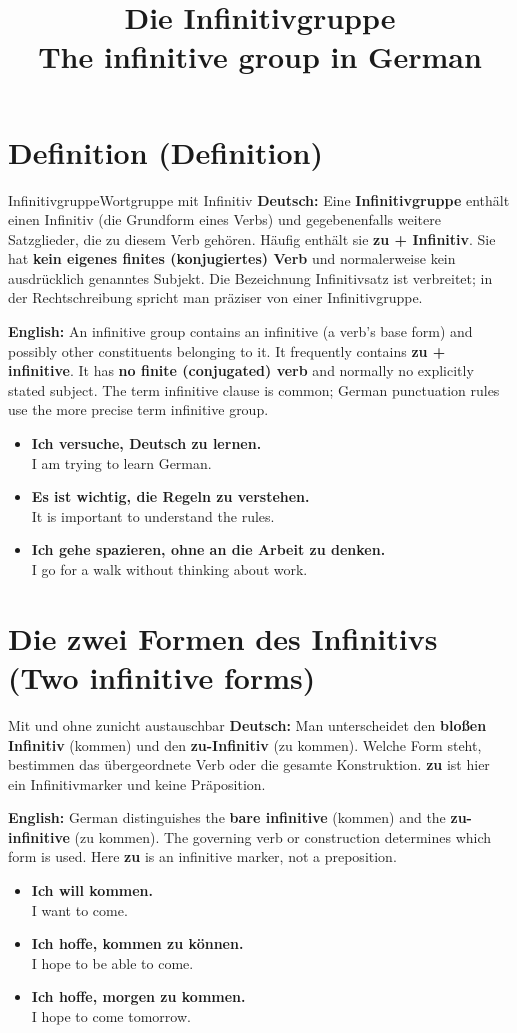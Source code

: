 \documentclass[a4paper,11pt]{article}
\title{Die Infinitivgruppe\\\large\textnormal{The infinitive group in German}}
\date{}
\newcommand{\GermanText}[1]{\textbf{Deutsch: }#1\par}
\newcommand{\EnglishText}[1]{{\small\color{SoftGray}\textbf{English: }#1\par}}
\newcommand{\ExampleItem}[2]{\item \textbf{#1}\\{\small\color{SoftGray}#2}}
\begin{document}
\maketitle
\tableofcontents
\newpage

\section{Definition \textnormal{(Definition)}}
\begin{grammarentry}{Infinitivgruppe}{Wortgruppe mit Infinitiv}
\GermanText{Eine \textbf{Infinitivgruppe} enthält einen Infinitiv (die Grundform eines Verbs) und gegebenenfalls weitere Satzglieder, die zu diesem Verb gehören. Häufig enthält sie \textbf{zu + Infinitiv}. Sie hat \textbf{kein eigenes finites (konjugiertes) Verb} und normalerweise kein ausdrücklich genanntes Subjekt. Die Bezeichnung \glqq Infinitivsatz\grqq{} ist verbreitet; in der Rechtschreibung spricht man präziser von einer \glqq Infinitivgruppe\grqq.}
\EnglishText{An infinitive group contains an infinitive (a verb's base form) and possibly other constituents belonging to it. It frequently contains \textbf{zu + infinitive}. It has \textbf{no finite (conjugated) verb} and normally no explicitly stated subject. The term \glqq infinitive clause\grqq{} is common; German punctuation rules use the more precise term \glqq infinitive group\grqq.}
\end{grammarentry}
\begin{exbox}\begin{itemize}
\ExampleItem{Ich versuche, Deutsch zu lernen.}{I am trying to learn German.}
\ExampleItem{Es ist wichtig, die Regeln zu verstehen.}{It is important to understand the rules.}
\ExampleItem{Ich gehe spazieren, ohne an die Arbeit zu denken.}{I go for a walk without thinking about work.}
\end{itemize}\end{exbox}

\section{Die zwei Formen des Infinitivs \textnormal{(Two infinitive forms)}}
\begin{grammarentry}{Mit und ohne zu}{nicht austauschbar}
\GermanText{Man unterscheidet den \textbf{bloßen Infinitiv} (\glqq kommen\grqq) und den \textbf{zu-Infinitiv} (\glqq zu kommen\grqq). Welche Form steht, bestimmen das übergeordnete Verb oder die gesamte Konstruktion. \textbf{zu} ist hier ein Infinitivmarker und keine Präposition.}
\EnglishText{German distinguishes the \textbf{bare infinitive} (\glqq kommen\grqq) and the \textbf{zu-infinitive} (\glqq zu kommen\grqq). The governing verb or construction determines which form is used. Here \textbf{zu} is an infinitive marker, not a preposition.}
\end{grammarentry}
\begin{exbox}\begin{itemize}
\ExampleItem{Ich will kommen.}{I want to come.}
\ExampleItem{Ich hoffe, kommen zu können.}{I hope to be able to come.}
\ExampleItem{Ich hoffe, morgen zu kommen.}{I hope to come tomorrow.}
\end{itemize}\end{exbox}
\end{document}

